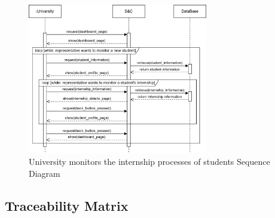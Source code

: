 \begin{figure}[H]
    \centering
    \includegraphics[width=0.70\textwidth]{Images/Sequence_Diagrams/monitor_SD.png}
    \caption{University monitors the internship processes of students Sequence Diagram}
\end{figure}


\subsection{Traceability Matrix}


